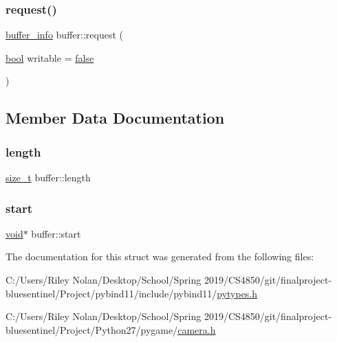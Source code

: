 \subsubsection{\texorpdfstring{request()}{request()}}
{\footnotesize\ttfamily \mbox{\hyperlink{structbuffer__info}{buffer\+\_\+info}} buffer\+::request (\begin{DoxyParamCaption}\item[{\mbox{\hyperlink{asdl_8h_af6a258d8f3ee5206d682d799316314b1}{bool}}}]{writable = {\ttfamily \mbox{\hyperlink{asdl_8h_af6a258d8f3ee5206d682d799316314b1ae9de385ef6fe9bf3360d1038396b884c}{false}}} }\end{DoxyParamCaption})\hspace{0.3cm}{\ttfamily [inline]}}



\subsection{Member Data Documentation}
\mbox{\label{classbuffer_a4f467cc251f2f4504d484913c7da47bd}} 
\subsubsection{\texorpdfstring{length}{length}}
{\footnotesize\ttfamily \mbox{\hyperlink{detail_2common_8h_a801d6a451a01953ef8cbae6feb6a3638}{size\+\_\+t}} buffer\+::length}

\mbox{\label{classbuffer_a8be3721dc0863d9dd7460504bbaeb0d1}} 
\subsubsection{\texorpdfstring{start}{start}}
{\footnotesize\ttfamily \mbox{\hyperlink{_s_d_l__opengles2__gl2ext_8h_ae5d8fa23ad07c48bb609509eae494c95}{void}}$\ast$ buffer\+::start}



The documentation for this struct was generated from the following files\+:\begin{DoxyCompactItemize}
\item 
C\+:/\+Users/\+Riley Nolan/\+Desktop/\+School/\+Spring 2019/\+C\+S4850/git/finalproject-\/bluesentinel/\+Project/pybind11/include/pybind11/\mbox{\hyperlink{pytypes_8h}{pytypes.\+h}}\item 
C\+:/\+Users/\+Riley Nolan/\+Desktop/\+School/\+Spring 2019/\+C\+S4850/git/finalproject-\/bluesentinel/\+Project/\+Python27/pygame/\mbox{\hyperlink{camera_8h}{camera.\+h}}\end{DoxyCompactItemize}

